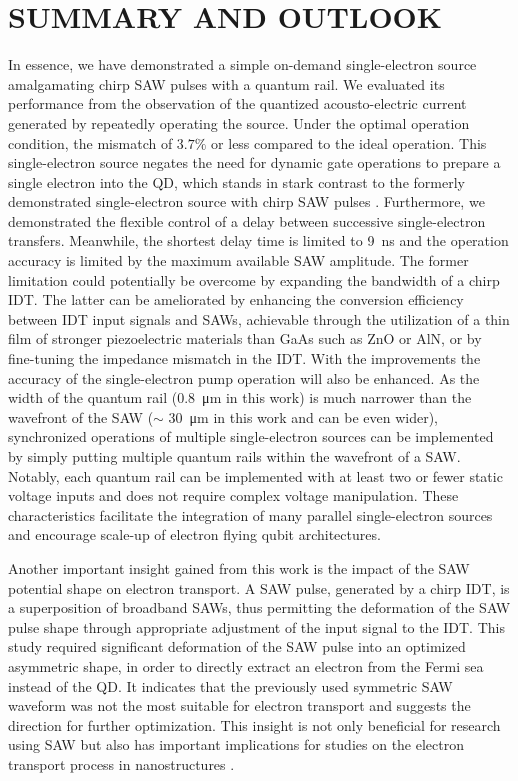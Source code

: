 \documentclass{article}
\begin{document}
\section{SUMMARY AND OUTLOOK}
In essence, we have demonstrated a simple on-demand single-electron source amalgamating chirp SAW pulses with a quantum rail.
We evaluated its performance from the observation of the quantized acousto-electric current generated by repeatedly operating the source. Under the optimal operation condition, the mismatch of $3.7 \%$ or less compared to the ideal operation.
This single-electron source negates the need for dynamic gate operations to prepare a single electron into the QD, which stands in stark contrast to the formerly demonstrated single-electron source with chirp SAW pulses \cite{JW_PRX2022}. 
Furthermore, we demonstrated the flexible control of a delay between successive single-electron transfers. Meanwhile, the shortest delay time is limited to \SI{9}{ns} and the operation accuracy is limited by the maximum available SAW amplitude.
The former limitation could potentially be overcome by expanding the bandwidth of a chirp IDT. The latter can be ameliorated by enhancing the conversion efficiency between IDT input signals and SAWs, achievable through the utilization of a thin film of stronger piezoelectric materials than GaAs such as ZnO or AlN, or by fine-tuning the impedance mismatch in the IDT. With the improvements the accuracy of the single-electron pump operation will also be enhanced. As the width of the quantum rail (\SI{0.8}{\micro m} in this work) is much narrower than the wavefront of the SAW ($\sim$ \SI{30}{\micro m} in this work and can be even wider), synchronized operations of multiple single-electron sources can be implemented by simply putting multiple quantum rails within the wavefront of a SAW. Notably, each quantum rail can be implemented with at least two or fewer static voltage inputs and does not require complex voltage manipulation. These characteristics facilitate the integration of many parallel single-electron sources and encourage scale-up of electron flying qubit architectures.

Another important insight gained from this work is the impact of the SAW potential shape on electron transport. A SAW pulse, generated by a chirp IDT, is a superposition of broadband SAWs, thus permitting the deformation of the SAW pulse shape through appropriate adjustment of the input signal to the IDT. This study required significant deformation of the SAW pulse into an optimized asymmetric shape, in order to directly extract an electron from the Fermi sea instead of the QD. It indicates that the previously used symmetric SAW waveform was not the most suitable for electron transport and suggests the direction for further optimization. This insight is not only beneficial for research using SAW but also has important implications for studies on the electron transport process in nanostructures \cite{Langrock2023,Seidler2022}.
\end{document}
